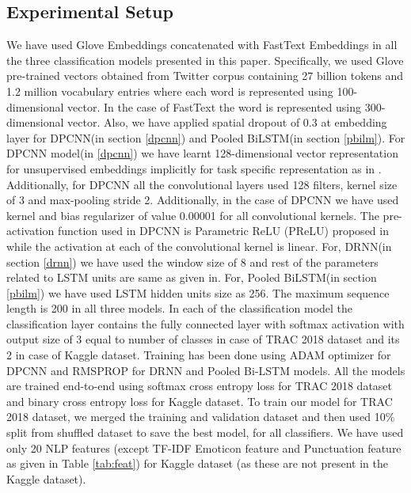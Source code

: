 \documentclass[sigconf]{acmart}
\begin{document}
\subsection{Experimental Setup}
We have used Glove Embeddings\cite{pennington2014glove} concatenated with FastText Embeddings\cite{mikolov2018advances} in all the three classification models presented in this paper. Specifically, we used Glove pre-trained vectors obtained from Twitter corpus containing 27 billion tokens and 1.2 million vocabulary entries where each word is represented using 100-dimensional vector. In the case of FastText the word is represented using 300-dimensional vector. Also, we have applied spatial dropout\cite{tompson2015efficient} of 0.3 at embedding layer for DPCNN(in section \ref{dpcnn}) and Pooled BiLSTM(in section \ref{pbilm}). For DPCNN model(in \ref{dpcnn}) we have learnt 128-dimensional vector representation for unsupervised embeddings implicitly for task specific representation as in \cite{johnson2017deep}. Additionally, for DPCNN all the convolutional layers used 128 filters, kernel size of 3 and max-pooling stride 2. Additionally, in the case of DPCNN we have used kernel and bias regularizer of value 0.00001 for all convolutional kernels. The pre-activation function used in DPCNN is Parametric ReLU (PReLU) proposed in \cite{he2015delving} while the activation at each of the convolutional kernel is linear. 
For, DRNN(in section \ref{drnn}) we have used the window size of 8 and rest of the parameters related to LSTM units are same as given in\cite{wang2018disconnected}. For, Pooled BiLSTM(in section \ref{pbilm}) we have used LSTM hidden units size as 256. The maximum sequence length is 200 in all three models.
In each of the classification model the classification layer contains the fully connected layer with softmax activation with output size of 3 equal to number of classes in case of TRAC 2018 dataset and its 2 in case of Kaggle dataset. Training has been done using ADAM optimizer\cite{kingma2014adam} for DPCNN and RMSPROP\cite{tieleman2012lecture} for DRNN and Pooled Bi-LSTM models. All the models are trained end-to-end using softmax cross entropy loss\cite{chollet2018keras} for TRAC 2018 dataset and binary cross entropy loss\cite{chollet2018keras} for Kaggle dataset.
\newline To train our model for TRAC 2018 dataset, we merged the training and validation dataset and then used 10\% split from shuffled dataset to save the best model, for all classifiers. We have used only 20 NLP features (except TF-IDF Emoticon feature and Punctuation feature as given in Table \ref{tab:feat}) for Kaggle dataset (as these are not present in the Kaggle dataset).
\end{document}
